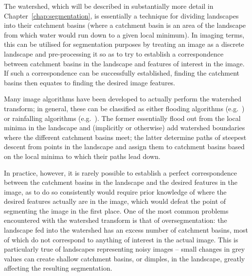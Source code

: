 The watershed, which will be described in substantially more detail in Chapter~\ref{chap:segmentation}, is essentially a technique for dividing landscapes into their catchment basins (where a catchment basin is an area of the landscape from which water would run down to a given local minimum). In imaging terms, this can be utilised for segmentation purposes by treating an image as a discrete landscape and pre-processing it so as to try to establish a correspondence between catchment basins in the landscape and features of interest in the image. If such a correspondence can be successfully established, finding the catchment basins then equates to finding the desired image features.

Many image algorithms have been developed to actually perform the watershed transform; in general, these can be classified as either flooding algorithms (e.g.~\cite{bieniek00,rambabu07}) or rainfalling algorithms (e.g.~\cite{meijster98,osma-ruiz06,stoev00}). The former essentially flood out from the local minima in the landscape and (implicitly or otherwise) add watershed boundaries where the different catchment basins meet; the latter determine paths of steepest descent from points in the landscape and assign them to catchment basins based on the local minima to which their paths lead down.

In practice, however, it is rarely possible to establish a perfect correspondence between the catchment basins in the landscape and the desired features in the image, as to do so consistently would require prior knowledge of where the desired features actually are in the image, which would defeat the point of segmenting the image in the first place. One of the most common problems encountered with the watershed transform is that of oversegmentation: the landscape fed into the watershed has an excess number of catchment basins, most of which do not correspond to anything of interest in the actual image. This is particularly true of landscapes representing noisy images -- small changes in grey values can create shallow catchment basins, or dimples, in the landscape, greatly affecting the resulting segmentation.


